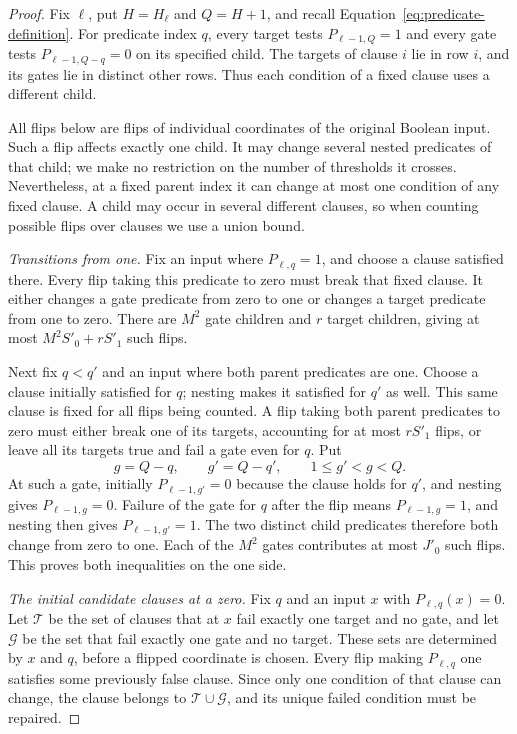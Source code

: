 \documentclass[11pt]{article}
\theoremstyle{definition}
\theoremstyle{remark}
\begin{document}
\begin{proof}
Fix $\ell$, put $H=H_\ell$ and $Q=H+1$, and recall
Equation~\eqref{eq:predicate-definition}.  For predicate index $q$, every
target tests $P_{\ell-1,Q}=1$ and every gate tests
$P_{\ell-1,Q-q}=0$ on its specified child.  The targets of clause $i$
lie in row $i$, and its gates lie in distinct other rows.  Thus each
condition of a fixed clause uses a different child.

All flips below are flips of individual coordinates of the original
Boolean input.  Such a flip affects exactly one child.  It may change
several nested predicates of that child; we make no restriction on the
number of thresholds it crosses.  Nevertheless, at a fixed parent index
it can change at most one condition of any fixed clause.  A child may
occur in several different clauses, so when counting possible flips
over clauses we use a union bound.

\emph{Transitions from one.}
Fix an input where $P_{\ell,q}=1$, and choose a clause satisfied there.
Every flip taking this predicate to zero must break that fixed clause.
It either changes a gate predicate from zero to one or changes a target
predicate from one to zero.  There are $M^2$ gate children and $r$
target children, giving at most $M^2S'_0+rS'_1$ such flips.

Next fix $q<q'$ and an input where both parent predicates are one.
Choose a clause initially satisfied for $q$; nesting makes it satisfied
for $q'$ as well.  This same clause is fixed for all flips being counted.
A flip taking both parent predicates to zero must either break one of
its targets, accounting for at most $rS'_1$ flips, or leave all its
targets true and fail a gate even for $q$.  Put
\[
 g=Q-q,\qquad g'=Q-q',\qquad 1\leq g'<g<Q.
\]
At such a gate, initially $P_{\ell-1,g'}=0$ because the clause holds
for $q'$, and nesting gives $P_{\ell-1,g}=0$.  Failure of the gate for
$q$ after the flip means $P_{\ell-1,g}=1$, and nesting then gives
$P_{\ell-1,g'}=1$.  The two distinct child predicates therefore both
change from zero to one.  Each of the $M^2$ gates contributes at most
$J'_0$ such flips.  This proves both inequalities on the one side.

\emph{The initial candidate clauses at a zero.}
Fix $q$ and an input $x$ with $P_{\ell,q}(x)=0$.  Let $\mathcal T$
be the set of clauses that at $x$ fail exactly one target and no gate,
and let $\mathcal G$ be the set that fail exactly one gate and no
target.  These sets are determined by $x$ and $q$, before a flipped
coordinate is chosen.  Every flip making $P_{\ell,q}$ one satisfies
some previously false clause.  Since only one condition of that clause
can change, the clause belongs to $\mathcal T\cup\mathcal G$, and
its unique failed condition must be repaired.


\end{proof}
\end{document}
